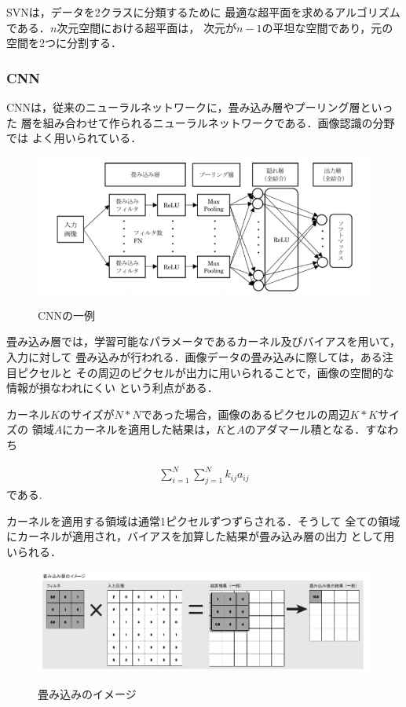SVNは，データを2クラスに分類するために
最適な超平面を求めるアルゴリズムである．$n$次元空間における超平面は，
次元が$n-1$の平坦な空間であり，元の空間を2つに分割する．

\subsubsection*{CNN}
CNNは，従来のニューラルネットワークに，畳み込み層やプーリング層といった
層を組み合わせて作られるニューラルネットワークである．画像認識の分野では
よく用いられている．

\begin{figure}[tp]
  \centering
  \includegraphics[scale=0.7]{fig/CNNep.png}
  \caption{CNNの一例} \cite{13}
\end{figure}

畳み込み層では，学習可能なパラメータであるカーネル及びバイアスを用いて，入力に対して
畳み込みが行われる．画像データの畳み込みに際しては，ある注目ピクセルと
その周辺のピクセルが出力に用いられることで，画像の空間的な情報が損なわれにくい
という利点がある．

カーネル$K$のサイズが$N*N$であった場合，画像のあるピクセルの周辺$K*K$サイズの
領域$A$にカーネルを適用した結果は，$K$と$A$のアダマール積となる．すなわち

\begin{eqnarray}
  \sum_{i=1}^{N} \sum_{j=1}^{N} k_{ij}a_{ij} \nonumber 
\end{eqnarray}
である.

カーネルを適用する領域は通常1ピクセルずつずらされる．そうして
全ての領域にカーネルが適用され，バイアスを加算した結果が畳み込み層の出力
として用いられる．

\begin{figure}[tp]
  \centering
  \includegraphics[scale=0.6]{fig/conv.png}
  \caption{畳み込みのイメージ} \cite{14}
\end{figure}

